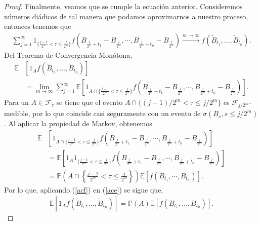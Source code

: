\begin{proof}
Finalmente, veamos que se cumple la ecuación anterior. Consideremos números diádicos de tal manera que podamos aproximarnos a nuestro proceso, entonces tenemos que
	\begin{align*}
	\sum_{j = 1}^{\infty} 1_{ \{ \frac{j-1}{2^m} < \tau \leq \frac{j}{2^m} \} } f \left( B_{\frac{j}{2^m} + t_1} - B_{\frac{j}{2^m}}, \cdots, B_{\frac{j}{2^m} + t_n} - B_{\frac{j}{2^m}}  \right) \xrightarrow{m \rightarrow \infty} f \left( \tilde{B}_{t_1}, \ldots, \tilde{B}_{t_n} \right).
	\end{align*}
Del Teorema de Convergencia Monótona, 
	\begin{align}
	\mathbb{E} & \left[1_A f \left( \tilde{B}_{t_1}, \ldots, \tilde{B}_{t_n} \right) \right] \nonumber  \\
	& = \lim_{m \rightarrow \infty} \sum_{j = 1}^{\infty} \mathbb{E} \left[ 1_{ A \cap \{\frac{j-1}{2^m} < \tau \leq \frac{j}{2^m}\}} f \left( B_{\frac{j}{2^m} + t_1} - B_{\frac{j}{2^m}}, \cdots, B_{\frac{j}{2^m} + t_n} - B_{\frac{j}{2^m}}  \right) \right]. \label{ace}
	\end{align}
Para un $A \in \mathcal{F}_{\tau}$ se tiene que el evento $A \cap \{(j-1)/2^m < \tau \leq j/2^m\}$ es $\mathcal{F}_{j/2^m}$-medible, por lo que coincide casi seguramente con un evento de $\sigma(B_s, s \leq j/2^m)$. Al aplicar la propiedad de Markov, obtenemos
	\begin{align}
	\mathbb{E} & \left[ 1_{ A \cap \{\frac{j-1}{2^m} < \tau \leq \frac{j}{2^m}\}} f \left( B_{\frac{j}{2^m} + t_1} - B_{\frac{j}{2^m}}, \cdots, B_{\frac{j}{2^m} + t_n} - B_{\frac{j}{2^m}}  \right) \right] \nonumber \\
	& = \mathbb{E} \left[ 1_A 1_{\{\frac{j-1}{2^m} < \tau \leq \frac{j}{2^m}\}} f \left( B_{\frac{j}{2^m} + t_1} - B_{\frac{j}{2^m}}, \cdots, B_{\frac{j}{2^m} + t_n} - B_{\frac{j}{2^m}}  \right) \right] \nonumber \\
	& = \mathbb{P} \left( A \cap \left\{ \frac{j-1}{2^m} < \tau \leq \frac{j}{2^m} \right\} \right) \mathbb{E} \left[ f \left( B_{t_1}, \cdots, B_{t_n} \right) \right]. \label{acf}
	\end{align}
Por lo que, aplicando (\ref{acf}) en (\ref{ace}) se sigue que,
	\begin{align*}
	\mathbb{E} \left[ 1_A f \left( \tilde{B}_{t_1}, \ldots, \tilde{B}_{t_n} \right) \right] = \mathbb{P} (A) \mathbb{E} \left[ f \left( B_{t_1}, \ldots, B_{t_n} \right) \right].
	\end{align*}
\end{proof}





